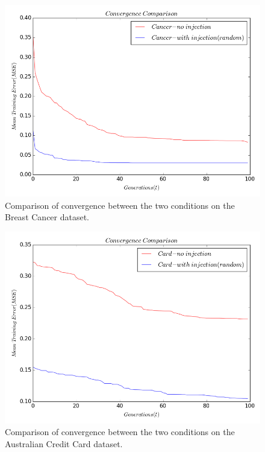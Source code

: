\documentclass[12pt]{article} %
\begin{document}
\begin{figure}[here]
\includegraphics[scale=0.6]{errs_no_inject_convergence_Cancer.png}
\caption{\label{Convergence_cancer_injection} Comparison of convergence between the two conditions on the Breast Cancer dataset.}
\end{figure}


\begin{figure}[here]
\includegraphics[scale=0.6]{errs_no_inject_convergence_Card.png}
\caption{\label{Convergence_cancer_injection} Comparison of convergence between the two conditions  on the Australian Credit Card dataset.}
\end{figure}
\end{document}
